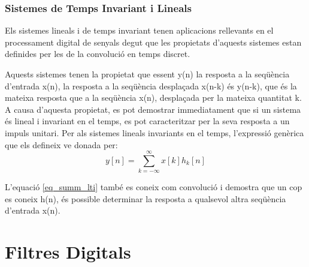 \subsubsection{Sistemes de Temps Invariant i Lineals}
\par Els sistemes lineals i de temps invariant tenen aplicacions rellevants en el processament digital de senyals degut que les propietats d'aquests sistemes estan definides per les de la convolució en temps discret. 

\par Aquests sistemes tenen la propietat que essent y(n) la resposta a la seqüència d'entrada x(n), la resposta a la seqüència desplaçada x(n-k) és y(n-k), que és la mateixa resposta que a la seqüència x(n), desplaçada per la mateixa quantitat k. A causa d'aquesta propietat, es pot demostrar immediatament que si un sistema és lineal i invariant en el temps, es pot caracteritzar per la seva resposta a un impuls unitari. Per als sistemes lineals invariants en el temps, l'expressió genèrica que els defineix ve donada per:
\begin{equation}\label{eq_summ_lti}
    y[n] = \sum_{k=-\infty}^{\infty} x[k]h_k[n] 
\end{equation}
\par L'equació \ref{eq_summ_lti} també es coneix com convolució i demostra que un cop es coneix h(n), és possible determinar la resposta a qualsevol altra seqüència d'entrada x(n). \cite{DiscreteTimeSP} 

\section{Filtres Digitals}
